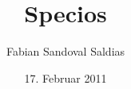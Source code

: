 \subject{Einführung}
\title{Specios}
\author{Fabian Sandoval Saldias}
\date{17. Februar 2011}
\publishers{Manufaktur fineshift }
